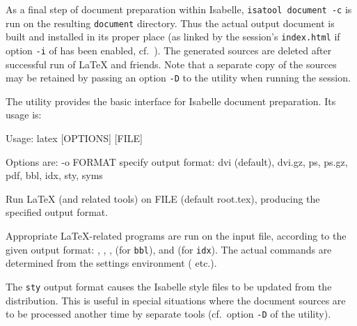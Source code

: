 \begin{isabellebody}
\begin{isamarkuptext}
  \medskip As a final step of document preparation within Isabelle,
  \verb|isatool document -c| is run on the resulting \verb|document| directory.  Thus the actual output document is built and
  installed in its proper place (as linked by the session's \verb|index.html| if option \verb|-i| of \hyperlink{tool.usedir}{\mbox{}} has
  been enabled, cf.\ ).  The generated sources are
  deleted after successful run of {\LaTeX} and friends.  Note that a
  separate copy of the sources may be retained by passing an option
  \verb|-D| to the \hyperlink{tool.usedir}{\mbox{}} utility when running the
  session.%
\end{isamarkuptext}%
\isamarkuptrue%
%
\isamarkuptrue%
%
\begin{isamarkuptext}%
The \hypertarget{tool.latex}{\hyperlink{tool.latex}{\mbox{}}} utility provides the basic interface for
  Isabelle document preparation.  Its usage is:
\begin{ttbox}
Usage: latex [OPTIONS] [FILE]

  Options are:
    -o FORMAT    specify output format: dvi (default), dvi.gz, ps,
                 ps.gz, pdf, bbl, idx, sty, syms

  Run LaTeX (and related tools) on FILE (default root.tex),
  producing the specified output format.
\end{ttbox}

  Appropriate {\LaTeX}-related programs are run on the input file,
  according to the given output format: \hyperlink{executable.latex}{\mbox{}},
  \hyperlink{executable.pdflatex}{\mbox{}}, \hyperlink{executable.dvips}{\mbox{}}, \hyperlink{executable.bibtex}{\mbox{}}
  (for \verb|bbl|), and \hyperlink{executable.makeindex}{\mbox{}} (for \verb|idx|).  The actual commands are determined from the settings
  environment (\hyperlink{setting.ISABELLE-LATEX}{\mbox{}} etc.).

  The \verb|sty| output format causes the Isabelle style files to
  be updated from the distribution.  This is useful in special
  situations where the document sources are to be processed another
  time by separate tools (cf.\ option \verb|-D| of the \hyperlink{tool.usedir}{\mbox{}} utility).


\end{isamarkuptext}
\end{isabellebody}
